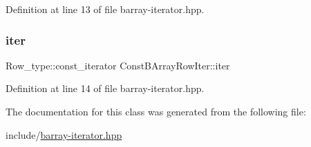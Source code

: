 Definition at line 13 of file barray-\/iterator.\+hpp.

\mbox{\label{class_const_b_array_row_iter_a327d031c9141eb0007d2fd7a528ebd76}} 
\subsubsection{\texorpdfstring{iter}{iter}}
{\footnotesize\ttfamily Row\+\_\+type\+::const\+\_\+iterator Const\+B\+Array\+Row\+Iter\+::iter}



Definition at line 14 of file barray-\/iterator.\+hpp.



The documentation for this class was generated from the following file\+:\begin{DoxyCompactItemize}
\item 
include/\hyperlink{barray-iterator_8hpp}{barray-\/iterator.\+hpp}\end{DoxyCompactItemize}
